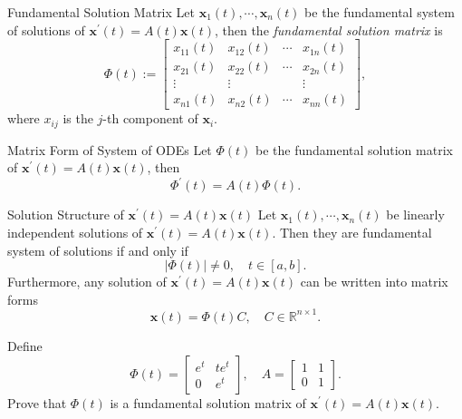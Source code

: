 \begin{definition}{Fundamental Solution Matrix}{}
  Let $\mathbf{x}_1(t),\cdots,\mathbf{x}_n(t)$ be the fundamental system of solutions of
  $\mathbf{x}^{\prime}(t) = A(t) \mathbf{x}(t)$,
  then the \emph{fundamental solution matrix} is
  \begin{equation}
    \Phi(t) := 
    \begin{bmatrix}
      x_{11}(t) & x_{12}(t) & \cdots & x_{1n}(t)\\
      x_{21}(t) & x_{22}(t) & \cdots & x_{2n}(t)\\
      \vdots & \vdots & & \vdots\\
      x_{n1}(t) & x_{n2}(t) & \cdots & x_{nn}(t)
    \end{bmatrix},
  \end{equation}
  where $x_{ij}$ is the $j$-th component of $\mathbf{x}_i$.
\end{definition}

\begin{proposition}{Matrix Form of System of ODEs}{}
  Let $\Phi(t)$ be the fundamental solution matrix of $\mathbf{x}^{\prime}(t) = A(t)\mathbf{x}(t)$,
  then
  \begin{equation}
    \Phi^{\prime}(t) = A(t) \Phi(t).
  \end{equation}
\end{proposition}

\begin{proposition}{Solution Structure of $\mathbf{x}^{\prime}(t) = A(t) \mathbf{x}(t)$}{}
  Let $\mathbf{x}_1(t),\cdots,\mathbf{x}_n(t)$ be linearly independent solutions
  of $\mathbf{x}^{\prime}(t) = A(t) \mathbf{x}(t)$.
  Then they are fundamental system of solutions if and only if
  \begin{equation}
    |\Phi(t)| \neq 0, \quad t \in [a,b].
  \end{equation}
  Furthermore, any solution of $\mathbf{x}^{\prime}(t) = A(t)\mathbf{x}(t)$ can be written into matrix forms
  \begin{equation}
    \mathbf{x}(t) = \Phi(t)C, \quad C \in \mathbb{R}^{n \times 1}.
  \end{equation}
\end{proposition}

\begin{example}{}{}
  Define
  \begin{equation}
    \Phi(t) =
      \begin{bmatrix}
        e^t & te^t\\
        0 & e^t
      \end{bmatrix},
      \quad A = 
      \begin{bmatrix}
        1 & 1\\
        0 & 1
      \end{bmatrix}.
  \end{equation}
  Prove that $\Phi(t)$ is a fundamental solution matrix of $\mathbf{x}^{\prime}(t) = A(t)\mathbf{x}(t)$.
\end{example}

